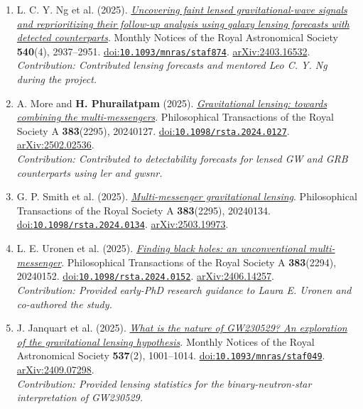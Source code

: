 \documentclass[10pt]{article}
\begin{document}
\begin{enumerate}
\item L. C. Y. Ng et al. (2025). \href{https://doi.org/10.1093/mnras/staf874}{\textit{Uncovering faint lensed gravitational-wave signals and reprioritizing their follow-up analysis using galaxy lensing forecasts with detected counterparts}}. Monthly Notices of the Royal Astronomical Society \textbf{540}(4), 2937--2951. \href{https://doi.org/10.1093/mnras/staf874}{doi:\nolinkurl{10.1093/mnras/staf874}}. \href{https://arxiv.org/abs/2403.16532}{arXiv:2403.16532}.\\\emph{Contribution: Contributed lensing forecasts and mentored Leo C. Y. Ng during the project.}
\item A. More and \textbf{H. Phurailatpam} (2025). \href{https://doi.org/10.1098/rsta.2024.0127}{\textit{Gravitational lensing: towards combining the multi-messengers}}. Philosophical Transactions of the Royal Society A \textbf{383}(2295), 20240127. \href{https://doi.org/10.1098/rsta.2024.0127}{doi:\nolinkurl{10.1098/rsta.2024.0127}}. \href{https://arxiv.org/abs/2502.02536}{arXiv:2502.02536}.\\\emph{Contribution: Contributed to detectability forecasts for lensed GW and GRB counterparts using ler and gwsnr.}
\item G. P. Smith et al. (2025). \href{https://doi.org/10.1098/rsta.2024.0134}{\textit{Multi-messenger gravitational lensing}}. Philosophical Transactions of the Royal Society A \textbf{383}(2295), 20240134. \href{https://doi.org/10.1098/rsta.2024.0134}{doi:\nolinkurl{10.1098/rsta.2024.0134}}. \href{https://arxiv.org/abs/2503.19973}{arXiv:2503.19973}.
\item L. E. Uronen et al. (2025). \href{https://doi.org/10.1098/rsta.2024.0152}{\textit{Finding black holes: an unconventional multi-messenger}}. Philosophical Transactions of the Royal Society A \textbf{383}(2294), 20240152. \href{https://doi.org/10.1098/rsta.2024.0152}{doi:\nolinkurl{10.1098/rsta.2024.0152}}. \href{https://arxiv.org/abs/2406.14257}{arXiv:2406.14257}.\\\emph{Contribution: Provided early-PhD research guidance to Laura E. Uronen and co-authored the study.}
\item J. Janquart et al. (2025). \href{https://doi.org/10.1093/mnras/staf049}{\textit{What is the nature of GW230529? An exploration of the gravitational lensing hypothesis}}. Monthly Notices of the Royal Astronomical Society \textbf{537}(2), 1001--1014. \href{https://doi.org/10.1093/mnras/staf049}{doi:\nolinkurl{10.1093/mnras/staf049}}. \href{https://arxiv.org/abs/2409.07298}{arXiv:2409.07298}.\\\emph{Contribution: Provided lensing statistics for the binary-neutron-star interpretation of GW230529.}

\end{enumerate}
\end{document}
